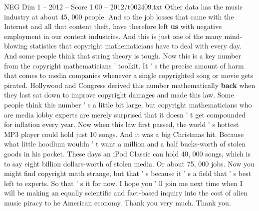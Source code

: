\begin{textsample}{NEG Dim 1 – 2012 – Score 1.00 – 2012/t002409.txt}
Other data has the music industry at about 45, 000 people.
And so the job losses that came with the Internet and all that content theft, have therefore left \textbf{us} with negative employment in our content industries.
And this is just one of the many mind-blowing statistics that copyright mathematicians have to deal with every day.
And some people think that string theory is tough.
Now this is a key number from the copyright mathematicians ' toolkit.
It ' s the precise amount of harm that comes to media companies whenever a single copyrighted song or movie gets pirated.
Hollywood and Congress derived this number mathematically \textbf{back} when they last sat down to improve copyright damages and made this law.
Some people think this number ' s a little bit large, but copyright mathematicians who are media lobby experts are merely surprised that it doesn ' t get compounded for inflation every year.
Now when this law first passed, the world ' s hottest MP3 player could hold just 10 songs.
And it was a big Christmas hit.
Because what little hoodlum wouldn ' t want a million and a half bucks-worth of stolen goods in his pocket.
These days an iPod Classic can hold 40, 000 songs, which is to say eight billion dollars-worth of stolen media.
Or about 75, 000 jobs.
Now you might find copyright math strange, but that ' s because it ' s a field that ' s best left to experts.
So that ' s it for now.
I hope you ' ll join me next time when I will be making an equally scientific and fact-based inquiry into the cost of alien music piracy to he American economy.
Thank you very much.
Thank you.

\end{textsample}
